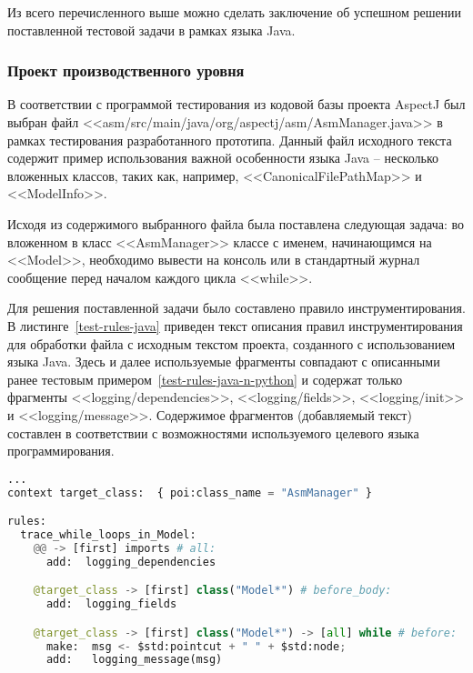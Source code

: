 Из всего перечисленного выше можно сделать заключение об успешном решении поставленной тестовой задачи в рамках языка Java.

\subsubsection{Проект производственного уровня}

В соответствии с программой тестирования из кодовой базы проекта AspectJ был выбран файл <<asm/src/main/java/org/aspectj/asm/AsmManager.java>> в рамках тестирования разработанного прототипа.
Данный файл исходного текста содержит пример использования важной особенности языка Java -- несколько вложенных классов, таких как, например, <<CanonicalFilePathMap>> и <<ModelInfo>>.

Исходя из содержимого выбранного файла была поставлена следующая задача:
во вложенном в класс <<AsmManager>> классе с именем, начинающимся на <<Model>>, необходимо вывести на консоль или в стандартный журнал сообщение перед началом каждого цикла <<while>>.

Для решения поставленной задачи было составлено правило инструментирования.
В листинге~\ref{test-rules-java} приведен текст описания правил инструментирования для обработки файла с исходным текстом проекта, созданного с использованием языка Java.
Здесь и далее используемые фрагменты совпадают с описанными ранее тестовым примером~\ref{test-rules-java-n-python} и содержат только фрагменты <<logging/dependencies>>, <<logging/fields>>, <<logging/init>> и <<logging/message>>.
Содержимое фрагментов (добавляемый текст) составлен в соответствии с возможностями используемого целевого языка программирования.

\begin{lstlisting}[frame=single, language=Python, label={test-rules-java}, caption={Описание правил инструментирования. Java-проект.}]
...
context target_class:  { poi:class_name = "AsmManager" }

rules:
  trace_while_loops_in_Model:
    @@ -> [first] imports # all:
      add:  logging_dependencies

    @target_class -> [first] class("Model*") # before_body:
      add:  logging_fields

    @target_class -> [first] class("Model*") -> [all] while # before:
      make:  msg <- $std:pointcut + " " + $std:node;
      add:   logging_message(msg)
\end{lstlisting}

